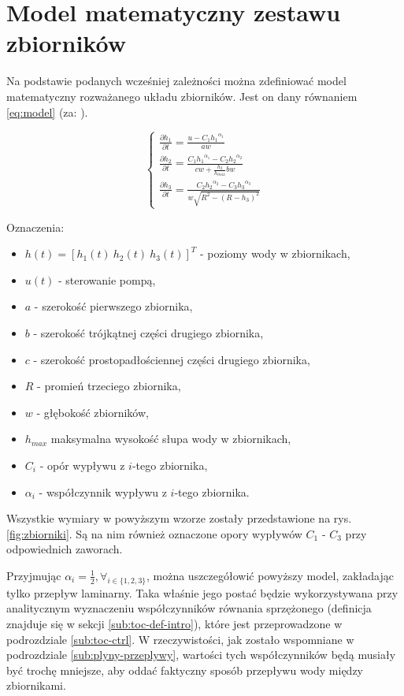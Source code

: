 \section{Model matematyczny zestawu zbiorników}
\label{sec:model}

Na podstawie podanych wcześniej zależności można zdefiniować model matematyczny rozważanego układu zbiorników.
Jest on dany równaniem \ref{eq:model} (za: \cite{TanksManual}).

\begin{equation}\label{eq:model}
\left \{
\begin{array}{lr}
\frac{\partial h_{1}}{\partial t} = \frac{u - C_{1}{h_{1}}^{\alpha_{1}}}{aw} \\[8pt]
\frac{\partial h_{2}}{\partial t} = \frac{C_{1}{h_{1}}^{\alpha_{1}} -  C_{2}{h_{2}}^{\alpha_{2}}}{cw + \frac{h_{2}}{h_{max}}bw} \\[12pt]
\frac{\partial h_{3}}{\partial t} = \frac{C_{2}{h_{2}}^{\alpha_{2}} -  C_{3}{h_{3}}^{\alpha_{3}}}{w\sqrt{R^{2} - (R - h_{3})^{2}}}
\end{array}
\right.
\end{equation}

Oznaczenia:
\begin{itemize}
    \item $h(t) = [h_{1}(t)~ h_{2}(t)~ h_{3}(t)]^{T}$ - poziomy wody w zbiornikach,
    \item $u(t)$ - sterowanie pompą,
    \item $a$ - szerokość pierwszego zbiornika,
    \item $b$ - szerokość trójkątnej części drugiego zbiornika,
    \item $c$ - szerokość prostopadłościennej części drugiego zbiornika,
    \item $R$ - promień trzeciego zbiornika,
    \item $w$ - głębokość zbiorników,
    \item $h_{max}$ maksymalna wysokość słupa wody w zbiornikach,
    \item $C_{i}$ - opór wypływu z $i$-tego zbiornika,
    \item $\alpha_{i}$ - współczynnik wypływu z $i$-tego zbiornika.
\end{itemize}

Wszystkie wymiary w powyższym wzorze zostały przedstawione na rys. \ref{fig:zbiorniki}. Są na nim również oznaczone opory wypływów $C_{1}$ - $C_{3}$ przy odpowiednich zaworach.

Przyjmując $\alpha_{i} = \frac{1}{2}, \forall_{i \in \{1, 2, 3\}}$, można uszczegółowić powyższy model, zakładając tylko przepływ laminarny.
Taka właśnie jego postać będzie wykorzystywana przy analitycznym wyznaczeniu współczynników równania sprzężonego (definicja znajduje się w sekcji \ref{sub:toc-def-intro}), które jest przeprowadzone w podrozdziale \ref{sub:toc-ctrl}.
W rzeczywistości, jak zostało wspomniane w podrozdziale \ref{sub:plyny-przeplywy}, wartości tych współczynników będą musiały być trochę mniejsze, aby oddać faktyczny sposób przepływu wody między zbiornikami.

